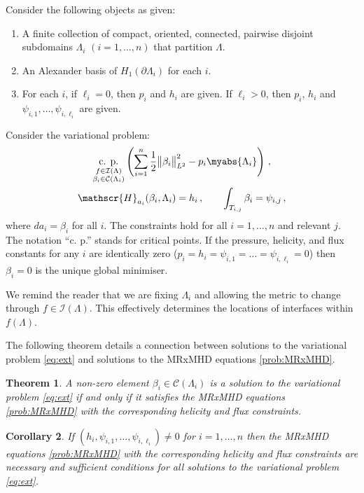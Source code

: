 \documentclass[11pt]{article}
\theoremstyle{plain}
\newtheorem{theorem}{Theorem}[section]
\newtheorem{corollary}[theorem]{Corollary}
\theoremstyle{definition}
\theoremstyle{remark}
\newcommand{\ST}{\Lambda}
\newcommand{\C}{\mathcal{C} (\ST_i)}
\newcommand{\I}{\mathcal{I}(\ST)}
\begin{document}
Consider the following objects as given:
\begin{enumerate}
  \item A finite collection of compact, oriented, connected, pairwise disjoint subdomains \(\ST_i\) \((i=1,\dots,n)\) that partition \(\ST\). 
  \item An Alexander basis of \(H_1(\partial\ST_i)\) for each \(i\).
  \item For each \(i\), if \(\ell_i=0\), then \(p_i\) and \(h_i\) are given. If \(\ell_i>0\), then \(p_i\), \(h_i\) and \(\psi_{i,1},\dots,\psi_{i,\ell_i}\) are given. 
\end{enumerate}
Consider the variational problem:
\begin{align} \label{eq:ext}
    \begin{gathered} 
    \underset{\substack{f \in \I \\ \beta _i \in \mathcal{C} ( \ST_i)} }{ \text{c. p.} } \left( \sum_{i=1}^n  \frac{1}{2} \big\|\beta _i\big\|_{L^2}^2 -  p_i \myabs{ \ST_i } \right) \, , \\
    \mathscr{H}_{a_i}( \beta_i,  \ST_i) = h_i\, , \qquad
    \int_{T_{i,j} } \beta _i = \psi_{i,j}\, ,
    \end{gathered}
\end{align}
where \(d a_i = \beta_i\) for all \(i\). The constraints hold for all \(i = 1, \dots, n\) and relevant \(j\). The notation “c. p.'' stands for critical points. If the pressure, helicity, and flux constants for any \(i\) are identically zero (\(p_i = h_i = \psi_{i,1} = \dots = \psi_{i,\ell_i}=0\)) then \(\beta _i=0\) is the unique global minimiser. 

We remind the reader that we are fixing \(\ST_i\) and allowing the metric to change through \(f \in \I\). This effectively determines the locations of interfaces within \(f(\ST)\). 

The following theorem details a connection between solutions to the variational problem \eqref{eq:ext} and solutions to the MRxMHD equations \eqref{prob:MRxMHD}. 

\begin{theorem}\label{thr:iff_simple}
    A non-zero element \(\beta_i \in \C\) is a solution to the variational problem \eqref{eq:ext} if and only if it satisfies the MRxMHD equations \eqref{prob:MRxMHD} with the corresponding helicity and flux constraints.
\end{theorem}


\begin{corollary}%
    If \((h_i, \psi_{i,1}, \dots, \psi_{i, \ell_i}) \neq 0\) for \(i = 1, \dots, n\) then the MRxMHD equations \eqref{prob:MRxMHD} with the corresponding helicity and flux constraints are necessary and sufficient conditions for all solutions to the variational problem \eqref{eq:ext}.
\end{corollary}
\end{document}
